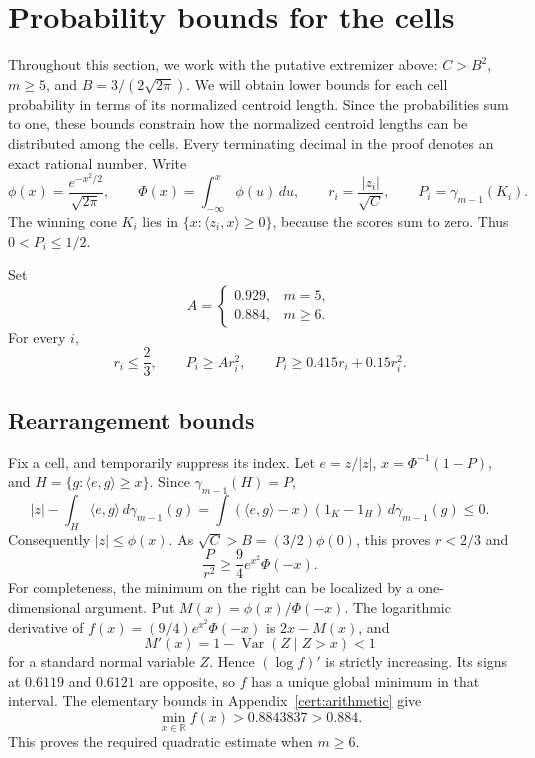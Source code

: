 \section{Probability bounds for the cells}\label{sc:section}
Throughout this section, we work with the putative extremizer above:
\(C>B^2\), \(m\ge5\), and \(B=3/(2\sqrt{2\pi})\).
We will obtain lower bounds for each cell probability in terms of its
normalized centroid length. Since the probabilities sum to one, these
bounds constrain how the normalized centroid lengths can be
distributed among the cells.
Every terminating decimal in the proof denotes an exact rational number.
Write
\[
 \phi(x)=\frac{e^{-x^2/2}}{\sqrt{2\pi}},\qquad
 \Phi(x)=\int_{-\infty}^x\phi(u)\,du,\qquad
 r_i=\frac{|z_i|}{\sqrt C},\qquad P_i=\gamma_{m-1}(K_i).
\]
The winning cone \(K_i\) lies in \(\{x:\langle z_i,x\rangle\ge0\}\),
because the scores sum to zero. Thus \(0<P_i\le1/2\).

\begin{lemma}\label{sc:bounds}
Set
\[
 A=\begin{cases}0.929,&m=5,\\0.884,&m\ge6.\end{cases}
\]
For every \(i\),
\begin{equation}\label{sc:three-bounds}
 r_i\le\frac23,\qquad P_i\ge Ar_i^2,\qquad
 P_i\ge0.415r_i+0.15r_i^2.
\end{equation}
\end{lemma}

\subsection{Rearrangement bounds}
Fix a cell, and temporarily suppress its index.
Let \(e=z/|z|\), \(x=\Phi^{-1}(1-P)\), and
\(H=\{g:\langle e,g\rangle\ge x\}\). Since \(\gamma_{m-1}(H)=P\),
\[
 |z|-\int_H\langle e,g\rangle\,d\gamma_{m-1}(g)
 =\int(\langle e,g\rangle-x)(1_K-1_H)\,d\gamma_{m-1}(g)\le0.
\]
Consequently \(|z|\le\phi(x)\). As \(\sqrt C>B=(3/2)\phi(0)\),
this proves \(r<2/3\) and
\begin{equation}\label{sc:halfspace-ratio}
 \frac P{r^2}\ge \frac94 e^{x^2}\Phi(-x).
\end{equation}
For completeness, the minimum on the right can be localized by a
one-dimensional argument. Put \(M(x)=\phi(x)/\Phi(-x)\).
The logarithmic derivative of \(f(x)=(9/4)e^{x^2}\Phi(-x)\) is
\(2x-M(x)\), and
\[
 M'(x)=1-\operatorname{Var}(Z\mid Z>x)<1
\]
for a standard normal variable \(Z\). Hence \((\log f)'\) is strictly
increasing. Its signs at \(0.6119\) and \(0.6121\) are opposite, so
\(f\) has a unique global minimum in that interval.
The elementary bounds in Appendix~\ref{cert:arithmetic} give
\begin{equation}\label{sc:halfspace-minimum}
 \min_{x\in\mathbb R}f(x)>0.8843837>0.884.
\end{equation}
This proves the required quadratic estimate when \(m\ge6\).

